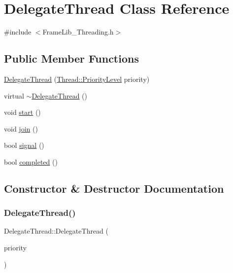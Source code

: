\hypertarget{class_delegate_thread}{}\section{Delegate\+Thread Class Reference}
\label{class_delegate_thread}


{\ttfamily \#include $<$Frame\+Lib\+\_\+\+Threading.\+h$>$}

\subsection*{Public Member Functions}
\begin{DoxyCompactItemize}
\item 
\hyperlink{class_delegate_thread_a96315fa93f55d173f193b1ccc593c0f8}{Delegate\+Thread} (\hyperlink{class_thread_a42f854dd02a3640e422b2f3288067744}{Thread\+::\+Priority\+Level} priority)
\item 
virtual \hyperlink{class_delegate_thread_a19c74ae776c205e9f0ea77119d11cb20}{$\sim$\+Delegate\+Thread} ()
\item 
void \hyperlink{class_delegate_thread_a45a890ecb21c6e560ff9e391837453ad}{start} ()
\item 
void \hyperlink{class_delegate_thread_a487fadd304c533222b14ff950bc05744}{join} ()
\item 
bool \hyperlink{class_delegate_thread_a2024b79dc8f91a1a5af085f41059bf1e}{signal} ()
\item 
bool \hyperlink{class_delegate_thread_a0f03ed4723a9517afb896108d20927e8}{completed} ()
\end{DoxyCompactItemize}


\subsection{Constructor \& Destructor Documentation}
\mbox{\label{class_delegate_thread_a96315fa93f55d173f193b1ccc593c0f8}} 
\subsubsection{\texorpdfstring{Delegate\+Thread()}{DelegateThread()}}
{\footnotesize\ttfamily Delegate\+Thread\+::\+Delegate\+Thread (\begin{DoxyParamCaption}\item[{\hyperlink{class_thread_a42f854dd02a3640e422b2f3288067744}{Thread\+::\+Priority\+Level}}]{priority }\end{DoxyParamCaption})\hspace{0.3cm}{\ttfamily [inline]}}

